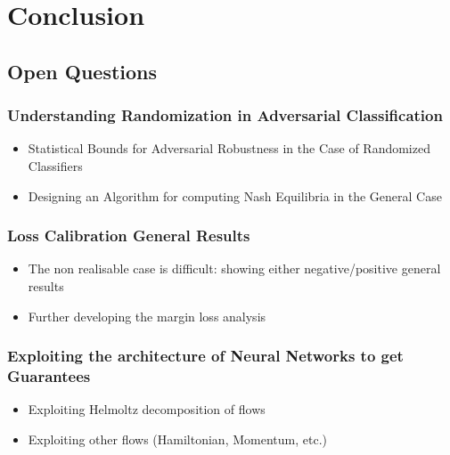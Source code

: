\chapter{Conclusion}
\minitoc
\section{Open Questions}


\subsection{Understanding Randomization in Adversarial Classification}

\begin{itemize}
    \item Statistical Bounds for Adversarial Robustness in the Case of Randomized Classifiers
    \item Designing an Algorithm for computing Nash Equilibria in the General Case
\end{itemize}


\subsection{Loss Calibration General Results}

\begin{itemize}
    \item The non realisable case is difficult: showing either negative/positive general results
    \item Further developing the margin loss analysis
\end{itemize}
\subsection{Exploiting the architecture of Neural Networks to get Guarantees}
\begin{itemize}
    \item Exploiting Helmoltz decomposition of flows
    \item Exploiting other flows (Hamiltonian, Momentum, etc.)
\end{itemize}








